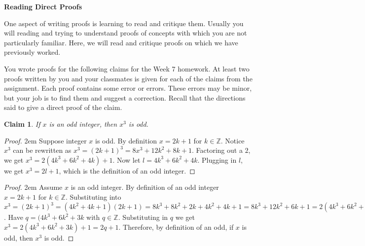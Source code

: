 \documentclass[12 pt]{article}
\newcommand{\Z}{\mathbb{Z}}
\theoremstyle{definition}
\theoremstyle{plain}
\theoremstyle{mytheorem}
\newtheorem{claim}{Claim}
\theoremstyle{myexample}
\theoremstyle{mydefinition}
\begin{document}
\begin{center}
\textbf{Reading Direct Proofs}
\end{center}

One aspect of writing proofs is learning to read and critique them.  Usually you will reading and trying to understand proofs of concepts with which you are not particularly familiar.  Here, we will read and critique proofs on which we have previously worked.

\begin{center}
\end{center}

\noindent You wrote proofs for the following claims for the Week 7 homework.  At least two proofs written by you and your classmates is given for each of the claims from the assignment.  Each proof contains some error or errors.  These errors may be minor, but your job is to find them and suggest a correction.  Recall that the directions said to give a direct proof of the claim.

 \begin{claim}  If $x$ is an odd integer, then $x^3$ is odd.
\end{claim}
\vspace{-.3in}
\begin{proof} \openup 2em {Suppose integer $x$ is odd.  By definition $x=2k+1$ for $k \in \Z$.  Notice $x^3$ can be rewritten as $x^3=(2k+1)^3=8x^3+12k^2+8k+1$.  Factoring out a $2$, we get $x^3 = 2(4k^3+6k^2+4k)+1.$  Now let $l=4k^3+6k^2+4k$.  Plugging in $l$, we get $x^3=2l+1$, which is the definition of an odd integer.}
\end{proof}
\begin{center} \underline{\hspace{\textwidth}} \end{center}
\begin{proof} \openup 2em{
Assume $x$ is an odd integer.  By definition of an odd integer $x=2k+1$ for $k \in \Z$.  Substituting into $x^3=(2k+1)^3=(4k^2+4k+1)(2k+1)=8k^3+8k^2+2k+4k^2+4k+1=8k^3+12k^2+6k+1=2(4k^3+6k^2+3k)+1$.  Have $q= (4k^3+6k^2+3k$ with $q \in \Z$.  Substituting in $q$ we get $x^3 = 2(4k^3+6k^2+3k)+1 = 2q+1$.  Therefore, by definition of an odd, if $x$ is odd, then $x^3$ is odd.}
\end{proof}
\end{document}
